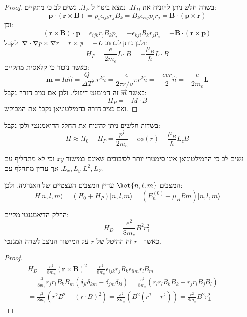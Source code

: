 \documentclass{tstextbook}
\begin{document}
\begin{proof}
בשדה חלש ניתן להזניח את \(H_{D}\). נמצא ביטוי ל-\(H_{P}\). נשים לב כי מתקיים:
$$\mathbf{p}\cdot(\mathbf{r}\times\mathbf{B})=p_{i}\epsilon_{i j k}r_{j}B_{k}=B_{k}\epsilon_{k i j}p_{i}r_{j}=\mathbf{B}\cdot(\mathbf{p}\times\mathbf{r})$$
וכן:
$$(\mathbf{r}\times\mathbf{B})\cdot\mathbf{p}=\epsilon_{i j k}r_{j}B_{k}p_{i}=-\epsilon_{k j i}B_{k}r_{j}p_{i}=-\mathbf{B}\cdot(\mathbf{r}\times\mathbf{p})$$
ולכן ניתן לכתוב \({\bf\nabla}\cdot{\bf\nabla}p\times{\bf\nabla}r=r\times p=-L\) ולקבל:
$$H_{P}=\frac{e}{2m_{e}}L\cdot B=-\frac{\mu_{B}}{\hbar}L \cdot B$$
כאשר נזכור כי קלאסית מתקיים:
$$\mathbf{m}=I a{\hat{n}}={\frac{Q}{\Delta T}}\pi r^{2}{\hat{n}}={\frac{-e}{2\pi r/v}}\pi r^{2}{\hat{n}}=-{\frac{e v r}{2}}{\hat{n}}=-{\frac{e}{2m_{e}}}\mathbf{L}$$
כאשר \(\vec{m}\) זה המומנט דיפולי. ולכן אם נציב חזרה נקבל:
$$H_{P}=-M\cdot B$$
ואם נציב חזרה בהמילטוניאן נקבל את המבוקש.

\end{proof}
\begin{corollary}
בשדות חלשים ניתן להזניח את החלק הדיאמגנטי ולכן נקבל:
$$H\approx H_{0}+H_{P}=\frac{p^{2}}{2m_{e}}-e\phi(r)-\frac{\mu_{B}}{\hbar}L_{z}B$$

\end{corollary}
\begin{remark}
נשים לב כי ההמילטוניאן אינו סימטרי יותר לסיבובים שאינם במישור \(xy\) וכי לא מתחליף עם \(L_{x},L_{y}\), אך עדיין מתחלף עם \(L^{2},L_{Z}\).

\end{remark}
\begin{corollary}
המצבים \(\ket{n,\ell ,m}\) עדיין המצבים העצמיים של האנרגיה, ולכן:
$$H|n,l,m\rangle=\left(H_{0}+H_{P}\right)|n,l,m\rangle=\left(E_{n}^{(0)}-\mu_{B}B m\right)|n,l,m\rangle$$

\end{corollary}
\begin{proposition}
החלק הדיאמגנטי מקיים:
$$H_{D}=\frac{e^{2}}{8m_{e}}B^{2}r_{\perp}^{2}$$
כאשר \(r_{\perp}\) זה ההיטל של \(r\) על המישור הניצב לשדה המגנטי.

\end{proposition}
\begin{proof}
\begin{gather*}H_{D}=\frac{e^{2}}{8m_{e}}\left(\mathbf{r}\times\mathbf{B}\right)^{2}=\frac{e^{2}}{8m_{e}}\epsilon_{i j k}r_{j}B_{k}\epsilon_{i l m}r_{l}B_{m}=\\=\frac{e^{2}}{8m_{e}}r_{j}r_{l}B_{k}B_{m}\left(\delta_{j l}\delta_{k m}-\delta_{j m}\delta_{k l}\right)=\frac{e^{2}}{8m_{e}}\left(r_{l}r_{l}B_{k}B_{k}-r_{j}r_{l}B_{j}B_{l}\right)=\\=\frac{e^{2}}{8m_{e}}\left(r^{2}B^{2}-\left(r\cdot B\right)^{2}\right)=\frac{e^{2}}{8m_{e}}\left(B^{2}\left(r^{2}-r_{||}^{2}\right)\right)=\frac{e^{2}}{8m_{e}}B^{2}r_{\perp}^{2} 
\end{gather*}

\end{proof}
\end{document}
